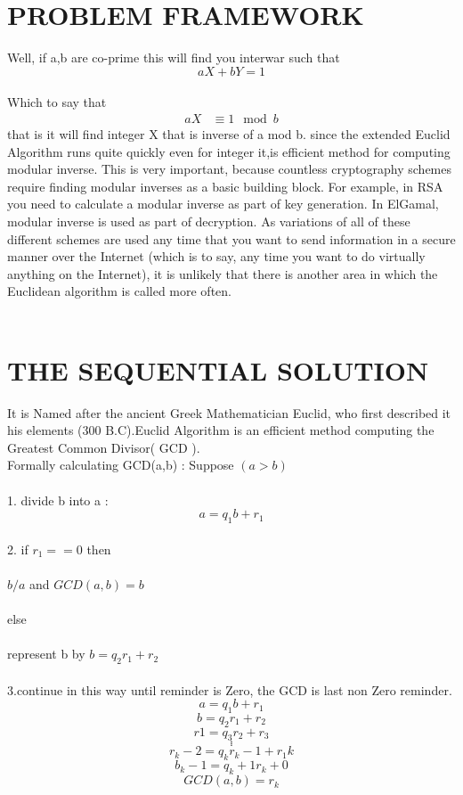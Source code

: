 \documentclass[12pt]{article}
\begin{document}
\section{\textcolor{BurntOrange}{ PROBLEM FRAMEWORK }}
\textsf
Well, if a,b are co-prime this will find you interwar such that 
    \[ aX + bY = 1 \] \\
Which to say that 
 \begin{align*}
     aX &\equiv 1\mod b 
 \end{align*}
                  that is it will find integer X that is inverse of a mod b. since the extended Euclid Algorithm runs quite quickly even for integer it,is efficient method for computing modular inverse. This is very important, because countless cryptography schemes require finding modular inverses as a basic building block.
For example, in RSA you need to calculate a modular inverse as part of key generation. In ElGamal, modular inverse is used as part of decryption. As variations of all of these different schemes are used any time that you want to send information in a secure manner over the Internet (which is to say, any time you want to do virtually anything on the Internet), it is unlikely that there is another area in which the Euclidean algorithm is called more often.
\\\\
\newpage
\section{\textcolor{BurntOrange}{THE SEQUENTIAL SOLUTION}}
\textsf
It is Named after the ancient Greek Mathematician Euclid, who first described
it his elements (300 B.C).Euclid Algorithm is an efficient method computing the Greatest Common Divisor( GCD ). \\ 

Formally calculating GCD(a,b) : Suppose $(a > b)$ \\\\
  1. divide b into a : $$ a=q_1b+r_1 $$ \\
  2. if $ r_1 == 0 $ then \\\\ $ b/a $ and $ GCD(a,b)=b $\\\\
     else \\\\ represent b by $b=q_2r_1+r_2$ \\\\
  3.continue in this way until reminder is Zero, the GCD is last non Zero reminder.
     \[ a = q_1b + r_1 \]
     \[ b = q_2r_1 + r_2 \]
     \[ r1 = q_3r_2 + r_3 \]
     \[ . \]
     \[ . \]
     \[ . \]
     \[ r_k-2 = q_kr_k-1 + r_1k\]
     \[ b_k-1 = q_k+1r_k + 0 \]
     \[ GCD(a,b)= r_k \]
  \\\\
    
\end{document}
